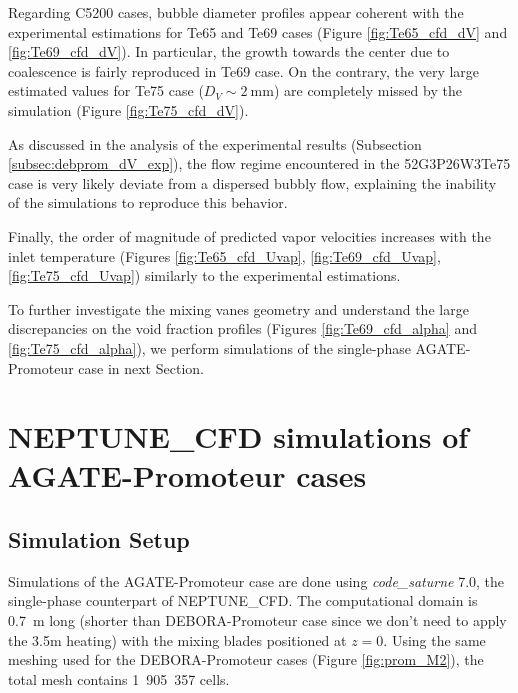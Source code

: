 \npar

Regarding C5200 cases, bubble diameter profiles appear coherent with the experimental estimations for Te65 and Te69 cases (Figure \ref{fig:Te65_cfd_dV} and \ref{fig:Te69_cfd_dV}). In particular, the growth towards the center due to coalescence is fairly reproduced in Te69 case. On the contrary, the very large estimated values for Te75 case ($D_{V} \sim 2\ $mm) are completely missed by the simulation (Figure \ref{fig:Te75_cfd_dV}).

\begin{remark*}{}
As discussed in the analysis of the experimental results (Subsection \ref{subsec:debprom_dV_exp}), the flow regime encountered in the 52G3P26W3Te75 case is very likely deviate from a dispersed bubbly flow, explaining the inability of the simulations to reproduce this behavior.
\end{remark*}


\npar


Finally, the order of magnitude of predicted vapor velocities increases with the inlet temperature (Figures \ref{fig:Te65_cfd_Uvap}, \ref{fig:Te69_cfd_Uvap}, \ref{fig:Te75_cfd_Uvap}) similarly to the experimental estimations.

\npar


To further investigate the mixing vanes geometry and understand the large discrepancies on the void fraction profiles (Figures \ref{fig:Te69_cfd_alpha} and \ref{fig:Te75_cfd_alpha}), we perform simulations of the single-phase AGATE-Promoteur case in next Section.





\section{NEPTUNE\_CFD simulations of AGATE-Promoteur cases}
\label{sec:agate_ncfd}


\subsection{Simulation Setup}

Simulations of the AGATE-Promoteur case are done using \textit{code\_saturne} 7.0, the single-phase counterpart of NEPTUNE\_CFD. The computational domain is 0.7\ m long (shorter than DEBORA-Promoteur case since we don't need to apply the 3.5m heating) with the mixing blades positioned at $z=0$. Using the same meshing used for the DEBORA-Promoteur cases (Figure \ref{fig:prom_M2}), the total mesh contains 1~905~357 cells.

